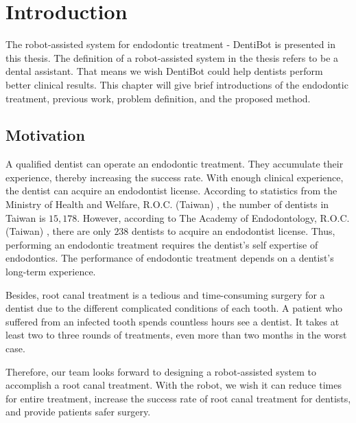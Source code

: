 \chapter{Introduction}
The robot-assisted system for endodontic treatment - DentiBot is presented in this thesis. The definition of a robot-assisted system in the thesis refers to be a dental assistant. That means we wish DentiBot could help dentists perform better clinical results. This chapter will give brief introductions of the endodontic treatment, previous work, problem definition, and the proposed method.
\section{Motivation}
\hspace*{6mm}A qualified dentist can operate an endodontic treatment. They accumulate their experience, thereby increasing the success rate. With enough clinical experience, the dentist can acquire an endodontist license. According to statistics from the Ministry of Health and Welfare, R.O.C. (Taiwan) \cite{web1}, the number of dentists in Taiwan is $15,178$. However, according to The Academy of Endodontology, R.O.C. (Taiwan) \cite{web2}, there are only $238$ dentists to acquire an endodontist license. Thus, performing an endodontic treatment requires the dentist's self expertise of endodontics. The performance of endodontic treatment depends on a dentist's long-term experience. 
\par
Besides, root canal treatment is a tedious and time-consuming surgery for a dentist due to the different complicated conditions of each tooth. A patient who suffered from an infected tooth spends countless hours see a dentist. It takes at least two to three rounds of treatments, even more than two months in the worst case.  
\par
Therefore, our team looks forward to designing a robot-assisted system to accomplish a root canal treatment.  With the robot, we wish it can reduce times for entire treatment, increase the success rate of root canal treatment for dentists, and provide patients safer surgery.

